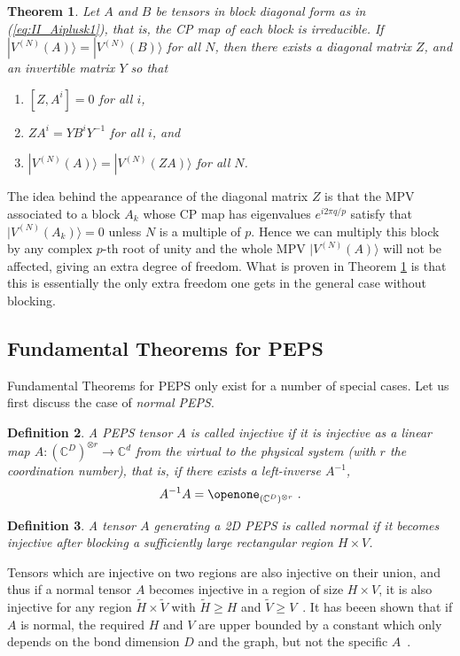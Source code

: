 \documentclass[rmp,aps,reprint,superscriptaddress,nobalancelastpage]{revtex4-1}
\newtheorem{thm}{Theorem}[section]
\newtheorem{defn}[thm]{Definition}
\begin{document}
    \begin{thm}\label{thm:fundamental-general}
        Let $A$ and $B$ be tensors in block diagonal form as in (\ref{eq:II_Aiplusk1}), that is, the CP map of each block is irreducible. If $|V^{(N)}(A)\rangle =|V^{(N)}(B)\rangle$ for all $N$, then there exists a diagonal matrix $Z$, and an invertible matrix $Y$ so that
        \begin{enumerate}
            \item[(i)] $[Z,A^{i}]=0$ for all $i$,
            \item[(ii)] $ZA^{i}=YB^i Y^{-1}$ for all $i$, and
            \item[(iii)] $|V^{(N)}(A)\rangle= |V^{(N)}(ZA)\rangle$ for all $N$.
        \end{enumerate}
    \end{thm}
    The idea behind the appearance of the diagonal matrix $Z$ is that the MPV associated to a block $A_k$ whose CP map has eigenvalues $e^{i 2\pi q/p}$ satisfy that $|V^{(N)}(A_k)\rangle =0$ unless $N$ is a multiple of $p$. Hence we can multiply this block by any complex $p$-th root of unity and the whole MPV $|V^{(N)}(A)\rangle$ will not be affected, giving an extra degree of freedom. What is proven in Theorem \ref{thm:fundamental-general} is that this is essentially the only extra freedom one gets in the general case without blocking.


    \subsection{Fundamental Theorems for PEPS\label{sec:4:fund-thm-peps}}

    Fundamental Theorems for PEPS only exist for a number of special cases.  Let us first discuss the case of  \emph{normal PEPS}.


    \begin{defn}
        \label{def:4:injectivity}
        A PEPS tensor $A$  is called injective if it is injective as a linear map $A:
            (\mathbb C^D)^{\otimes r}\to\mathbb C^d$ from the virtual to the physical system (with $r$ the coordination number), that is, if there exists a left-inverse $A^{-1}$,
        \[
            A^{-1}A=\openone_{(\mathbb{C}^D)^{\otimes r}}\ .
        \]
    \end{defn}

    \begin{defn}
        A tensor $A$ generating a 2D PEPS is called \emph{normal} if it becomes injective after blocking a sufficiently large rectangular region $H\times V$.
    \end{defn}
    Tensors which are injective on two regions are also injective on their union, and thus if a normal tensor $A$ becomes injective in a region of size $H\times V$, it is also injective for any region $\tilde{H}\times \tilde{V}$ with $\tilde{H}\ge H$ and $\tilde{V}\ge V$~\cite{perez-garcia:parent-ham-2d,molnar:normal-peps-fundamentalthm}. It has beeen shown that if $A$ is normal, the required $H$ and $V$ are upper bounded by a constant which only depends on the bond dimension $D$ and the graph, but not the specific $A$~\cite{michalek:2d-quantum-wielandt}.
\end{document}
